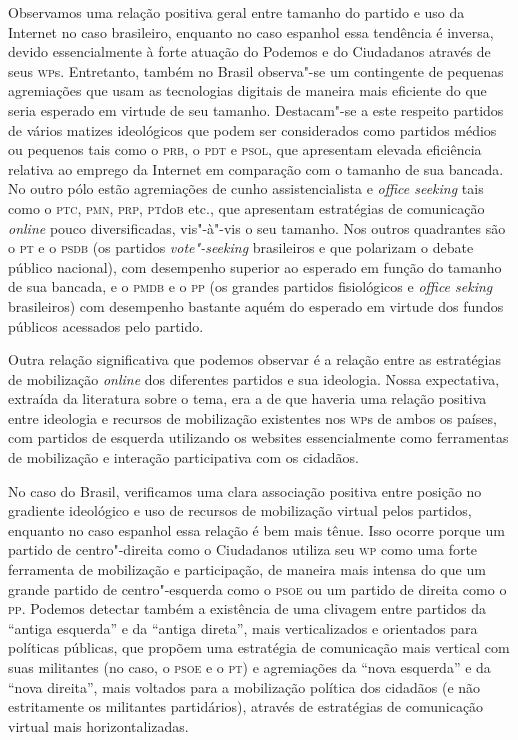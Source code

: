 Observamos uma relação positiva geral
entre tamanho do partido e uso da Internet no caso brasileiro, enquanto
no caso espanhol essa tendência é inversa, devido essencialmente à forte
atuação do Podemos e do Ciudadanos através de seus \textsc{wp}s.
Entretanto, também no Brasil observa"-se um contingente de pequenas
agremiações que usam as tecnologias digitais de maneira mais eficiente
do que seria esperado em virtude de seu tamanho. Destacam"-se a este
respeito partidos de vários matizes ideológicos que podem ser
considerados como partidos médios ou pequenos tais como o \textsc{prb}, o \textsc{pdt} e
\textsc{psol}, que apresentam elevada eficiência relativa ao emprego da Internet
em comparação com o tamanho de sua bancada. No outro pólo estão
agremiações de cunho assistencialista e \textit{office seeking} tais como o
\textsc{ptc}, \textsc{pmn}, \textsc{prp}, \textsc{pt}do\textsc{b} etc., que apresentam estratégias de comunicação
\emph{online} pouco diversificadas, vis"-à"-vis o seu tamanho. Nos outros
quadrantes são o \textsc{pt} e o \textsc{psdb} (os partidos \textit{vote"-seeking} brasileiros e
que polarizam o debate público nacional), com desempenho superior ao
esperado em função do tamanho de sua bancada, e o \textsc{pmdb} e o \textsc{pp} (os
grandes partidos fisiológicos e \textit{office seking} brasileiros) com
desempenho bastante aquém do esperado em virtude dos fundos públicos
acessados pelo partido.

Outra relação significativa que podemos observar é a relação entre as
estratégias de mobilização \emph{online} dos diferentes partidos e sua
ideologia. Nossa expectativa, extraída da literatura sobre o tema, era a
de que haveria uma relação positiva entre ideologia e recursos de
mobilização existentes nos \textsc{wp}s de ambos os países, com partidos de
esquerda utilizando os websites essencialmente como ferramentas de
mobilização e interação participativa com os cidadãos.

No caso do Brasil, verificamos uma clara associação positiva
entre posição no gradiente ideológico e uso de recursos de mobilização
virtual pelos partidos, enquanto no caso espanhol essa relação é bem
mais tênue. Isso ocorre porque um partido de centro"-direita como o
Ciudadanos utiliza seu \textsc{wp} como uma forte ferramenta de
mobilização e participação, de maneira mais intensa do que um grande
partido de centro"-esquerda como o \textsc{psoe} ou um partido de direita como o
\textsc{pp}. Podemos detectar também a existência de uma clivagem entre partidos
da ``antiga esquerda'' e da ``antiga direta'', mais verticalizados e
orientados para políticas públicas, que propõem uma estratégia de
comunicação mais vertical com suas militantes (no caso, o \textsc{psoe} e o \textsc{pt}) e
agremiações da ``nova esquerda'' e da ``nova direita'', mais voltados
para a mobilização política dos cidadãos (e não estritamente os
militantes partidários), através de estratégias de comunicação virtual
mais horizontalizadas.

